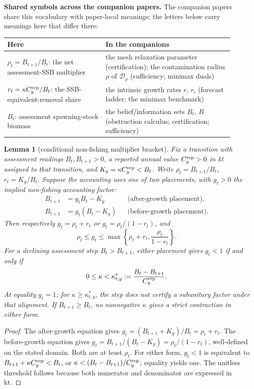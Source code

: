 \documentclass[10pt,twocolumn]{article}
\theoremstyle{plain}
\newtheorem{lemma}[theorem]{Lemma}
\theoremstyle{remark}
\begin{document}
\medskip
\noindent\textbf{Shared symbols across the companion papers.} The companion papers share this vocabulary with paper-local meanings; the letters below carry meanings here that differ there:
\begin{center}\small
\begin{tabular}{@{}p{0.40\linewidth}p{0.52\linewidth}@{}}
\toprule
\textbf{Here} & \textbf{In the companions} \\
\midrule
\(\rho_t=B_{t+1}/B_t\): the net assessment-SSB multiplier &
the mesh relaxation parameter (certification); the contamination radius
\(\rho\) of \(\mathcal{D}_{\rho}\) (sufficiency; minimax duals) \\
\(r_t=\kappa C_y^{\rm rep}/B_t\): the SSB-equivalent-removal share &
the intrinsic growth rates \(r\), \(r_i\) (forecast ladder; the
minimax benchmark) \\
\(B_t\): assessment spawning-stock biomass &
the belief/information sets \(B_t\), \(B\) (obstruction calculus;
certification; sufficiency) \\
\bottomrule
\end{tabular}
\end{center}

\begin{lemma}[conditional non-fishing multiplier bracket]\label{lem:bracket}
Fix a transition with assessment readings \(B_t,B_{t+1}>0\), a reported annual value \(C_y^{\rm rep}>0\) in kt assigned to that transition, and \(K_y=\kappa C_y^{\rm rep}<B_t\). Write \(\rho_t=B_{t+1}/B_t\), \(r_t=K_y/B_t\). Suppose the accounting uses one of two placements, with \(g_t>0\) the implied non-fishing accounting factor:
\[
\begin{aligned}
B_{t+1} &= g_t B_t-K_y && \text{(after-growth placement)},\\
B_{t+1} &= g_t(B_t-K_y) && \text{(before-growth placement)}.
\end{aligned}
\]
Then respectively \(g_t=\rho_t+r_t\) or \(g_t=\rho_t/(1-r_t)\), and
\[
\rho_t\le g_t\le\max\left\{\rho_t+r_t,\frac{\rho_t}{1-r_t}\right\}.
\]
For a declining assessment step \(B_t>B_{t+1}\), either placement gives \(g_t<1\) if and only if
\[
0\le\kappa<\kappa^*_{t,y}:=\frac{B_t-B_{t+1}}{C_y^{\rm rep}}.
\]
At equality \(g_t=1\); for \(\kappa\ge\kappa^*_{t,y}\), the step does not certify a subunitary factor under that alignment. If \(B_{t+1}\ge B_t\), no nonnegative \(\kappa\) gives a strict contraction in either form.
\end{lemma}

\begin{proof}
The after-growth equation gives \(g_t=(B_{t+1}+K_y)/B_t=\rho_t+r_t\). The before-growth equation gives \(g_t=B_{t+1}/(B_t-K_y)=\rho_t/(1-r_t)\), well-defined on the stated domain. Both are at least \(\rho_t\). For either form, \(g_t<1\) is equivalent to \(B_{t+1}+\kappa C_y^{\rm rep}<B_t\), or \(\kappa<(B_t-B_{t+1})/C_y^{\rm rep}\); equality yields one. The unitless threshold follows because both numerator and denominator are expressed in kt.
\end{proof}
\end{document}
